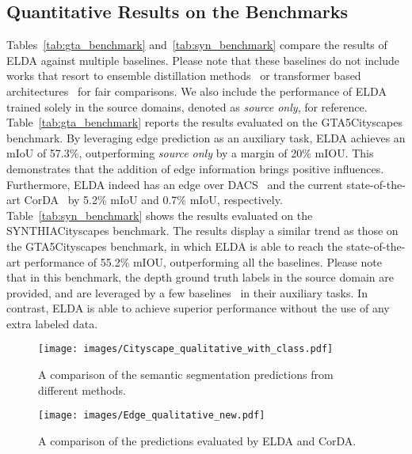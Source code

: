 \documentclass{bmvc2k}
\begin{document}
\subsection{Quantitative Results on the Benchmarks}
\label{subsec::quantitative_results}
Tables~\ref{tab:gta_benchmark} and~\ref{tab:syn_benchmark} compare the results of ELDA against multiple baselines. Please note that these baselines do not include works that resort to ensemble distillation methods~\cite{zhang2021prototypical,Chao_2021_CVPR,DBLP:journals/corr/abs-2112-00295} or transformer based architectures~\cite{hoyer2021daformer} for fair comparisons. We also include the performance of ELDA trained solely in the source domains, denoted as \textit{source only}, for reference.
Table~\ref{tab:gta_benchmark} reports the results evaluated on the GTA5Cityscapes benchmark. By leveraging edge prediction as an auxiliary task, ELDA achieves an mIoU of 57.3\%, outperforming \textit{source only} by a margin of 20\% mIOU. This demonstrates that the addition of edge information brings positive influences. Furthermore, ELDA indeed has an edge over DACS~\cite{tranheden2020dacs} and the current state-of-the-art CorDA~\cite{wang2021domain} by 5.2\% mIoU and 0.7\% mIoU, respectively. Table~\ref{tab:syn_benchmark} shows the results evaluated on the SYNTHIACityscapes benchmark. The results display a similar trend as those on the GTA5Cityscapes benchmark, in which ELDA is able to reach the state-of-the-art performance of 55.2\% mIOU, outperforming all the baselines. Please note that in this benchmark, the depth ground truth labels in the source domain are provided, and are leveraged by a few baselines~\cite{vu2019dada,Lee2019SPIGANPA,Chen_2019_GIOada,Saha_2021_CVPR_CTRL,guizilini2021geometric,wang2021domain} in their auxiliary tasks. In contrast, ELDA is able to achieve superior performance without the use of any extra labeled data.




\begin{figure}[t]
  \centering
  \texttt{[image: images/Cityscape\_qualitative\_with\_class.pdf]}
  \caption{A comparison of the semantic segmentation predictions from different methods. 
}
  \label{fig:Seg_Qualitative_Result}
\end{figure}

\begin{figure}[t]
  \centering
  \texttt{[image: images/Edge\_qualitative\_new.pdf]}
  \caption{
  A comparison of the predictions evaluated by ELDA and CorDA.
}
  \label{fig:Edge_Qualitative_Result}
\end{figure}
\end{document}
